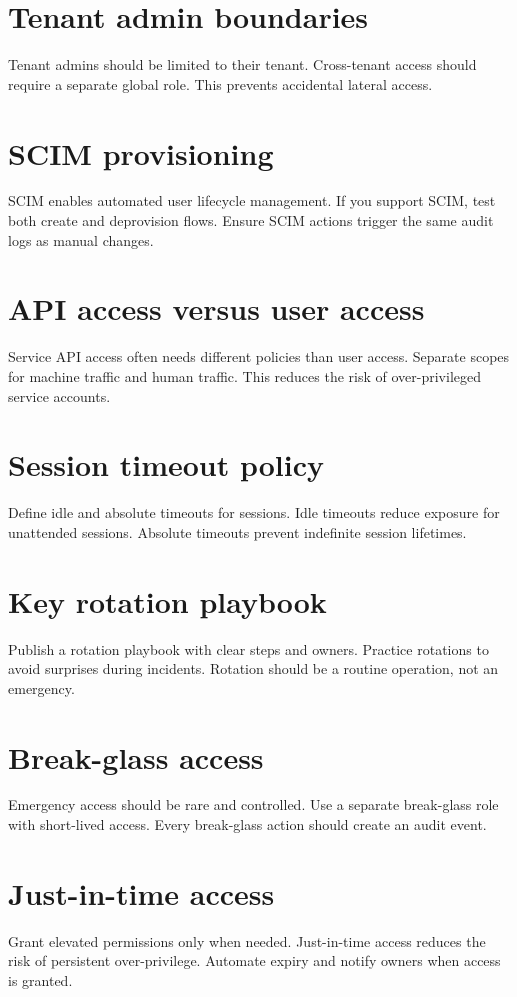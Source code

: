 \section{Tenant admin boundaries}
Tenant admins should be limited to their tenant.
Cross-tenant access should require a separate global role.
This prevents accidental lateral access.

\section{SCIM provisioning}
SCIM enables automated user lifecycle management.
If you support SCIM, test both create and deprovision flows.
Ensure SCIM actions trigger the same audit logs as manual changes.

\section{API access versus user access}
Service API access often needs different policies than user access.
Separate scopes for machine traffic and human traffic.
This reduces the risk of over-privileged service accounts.

\section{Session timeout policy}
Define idle and absolute timeouts for sessions.
Idle timeouts reduce exposure for unattended sessions.
Absolute timeouts prevent indefinite session lifetimes.

\section{Key rotation playbook}
Publish a rotation playbook with clear steps and owners.
Practice rotations to avoid surprises during incidents.
Rotation should be a routine operation, not an emergency.

\section{Break-glass access}
Emergency access should be rare and controlled.
Use a separate break-glass role with short-lived access.
Every break-glass action should create an audit event.

\section{Just-in-time access}
Grant elevated permissions only when needed.
Just-in-time access reduces the risk of persistent over-privilege.
Automate expiry and notify owners when access is granted.

